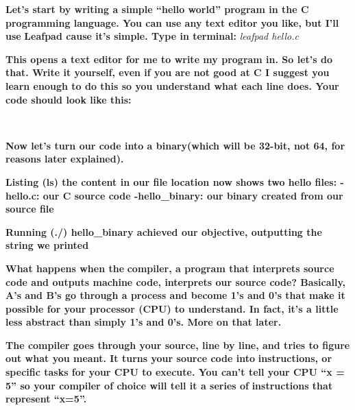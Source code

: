 \textbf{Let's start by writing a simple ``hello world'' program in the C programming language. You can use any text
editor you like, but I'll use }\textbf{\textcolor[rgb]{0.21960784,0.4627451,0.11372549}{Leafpad }}\textbf{cause it's
simple.\newline
Type in terminal:}\textit{ leafpad hello.c\newline
\ \ }  
 \textbf{ }

\textbf{This opens a text editor for me to write my program in. So let's do that. Write it yourself, even if you are not
good at C I suggest you learn enough to do this so you understand what each line does. Your code should look like
this:}

\textbf{\newline
\ \ }  
 

\textbf{Now let's turn our code into a binary(which will be 32-bit, not 64, for reasons later explained).}

  
 \textbf{\newline
Listing (ls) the content in our file location now shows two hello files: \newline
{}-hello.c: our C source code\newline
{}-hello\_binary: our binary created from our source file\newline
\ \ }  
 

\textbf{Running (./) hello\_binary achieved our objective, outputting the string we printed}

\textbf{What happens when the }\textbf{\textcolor[rgb]{0.21960784,0.4627451,0.11372549}{compiler}}\textbf{, a program
that interprets source code and outputs machine code, interprets our source code? Basically, A's and B's go through a
process and become 1's and 0's that make it possible for your processor (CPU) to understand. In fact, it's a little
less abstract than simply 1's and 0's. More on that later. }

\textbf{The compiler goes through your source, line by line, and tries to figure out what you meant. It turns your
source code into }\textbf{\textcolor[rgb]{0.21960784,0.4627451,0.11372549}{instructions}}\textbf{, or specific tasks
for your CPU to execute. You can't tell your CPU ``x = 5'' so your compiler of choice will tell it a series of
}\textbf{\textcolor[rgb]{0.21960784,0.4627451,0.11372549}{instructions }}\textbf{that represent ``x=5''.}



